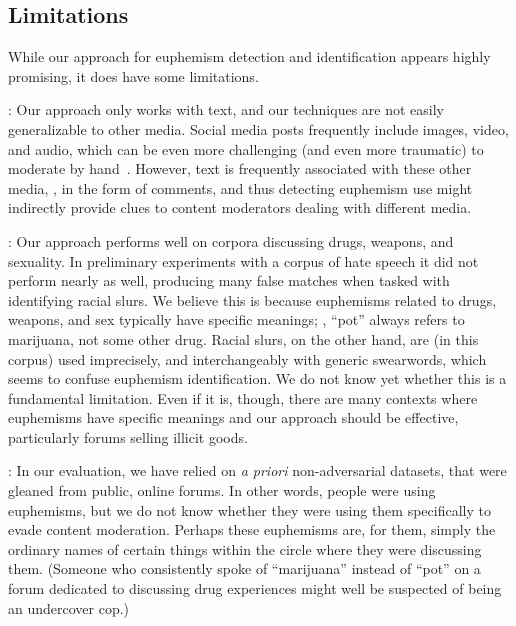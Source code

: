 \subsection{Limitations} 
While our approach for euphemism detection and identification
appears highly promising,
it does have some limitations.

\medskip 
{}: 
Our approach only works with text, and our techniques
are not easily generalizable to other media.
Social media posts frequently include images, video, and audio,
which can be even more challenging (and even more traumatic)
to moderate by hand~\cite{newton2019terror, newton2019trauma, ofcom:ai2019}.
However, text is frequently associated with these other media, 
\eg, in the form of comments, and thus detecting euphemism use might 
indirectly provide clues to content moderators dealing with 
different media. 

\medskip
{}:
Our approach performs well
on corpora discussing drugs, weapons, and sexuality.
In preliminary experiments
with a corpus of hate speech
it did not perform nearly as well,
producing many false matches
when tasked with identifying racial slurs.
We believe this is because
euphemisms related to drugs, weapons, and sex
typically have specific meanings;
\eg, ``pot'' always refers to marijuana, not some other drug.
Racial slurs, on the other hand,
are (in this corpus)
used imprecisely, and interchangeably with generic swearwords,
which seems to confuse euphemism identification.
We do not know yet whether this is a fundamental limitation.
Even if it is, though,
there are many  contexts where euphemisms have specific meanings
and our approach should be effective,  particularly forums selling illicit goods.

\medskip
{}: 
In our evaluation, we have relied on \textit{a priori} 
non-adversarial datasets, 
that were gleaned from public, online forums. 
In other words, people were using euphemisms, 
but we do not know whether they were using them
specifically to evade content moderation.
Perhaps these euphemisms are, for them,
simply the ordinary names of certain things
within the circle where they were discussing them.
(Someone who consistently spoke of ``marijuana'' instead of ``pot''
on a forum dedicated to discussing drug experiences
might well be suspected of being an undercover cop.)

